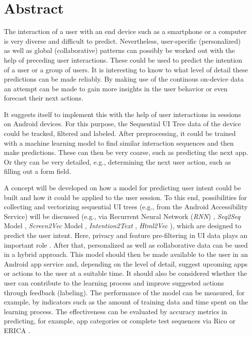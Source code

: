 \section*{Abstract}
\label{sec:abstract}


The interaction of a user with an end device such as a smartphone or a computer is very diverse and difficult to predict. Nevertheless, user-specific (personalized) as well as global (collaborative) patterns can possibly be worked out with the help of preceding user interactions. These could be used to predict the intention of a user or a group of users. It is interesting to know to what level of detail these predictions can be made reliably.
By making use of the continous on-device data an attempt can be made to gain more insights in the user behavior or even forecast their next actions.

It suggests itself to implement this with the help of user interactions in sessions on Android devices.
For this purpose, the Sequential UI Tree data of the device could be tracked, filtered and labeled.
After preprocessing, it could be trained with a machine learning model to find similar interaction sequences and then make predictions.
These can then be very coarse, such as predicting the next app.
Or they can be very detailed, e.g., determining the next user action, such as filling out a form field.

A concept will be developed on how a model for predicting user intent could be built and how it could be applied to the user session. To this end, possibilities for collecting and vectorizing sequential UI trees (e.g., from the Android Accessibility Service) will be discussed (e.g., via Recurrent Neural Network (\textit{RNN}) \cite{quadrana2017personalizing} \cite{bansal2022remembering} \cite{pietro2022recommendationSystems}, \textit{Seq2Seq} Model \cite{chollet2017seq2seq},
\textit{Screen2Vec} Model \cite{li2021screen2vec}, 
\textit{Intention2Text} \cite{yu2020understanding}, \textit{Html2Vec} \cite{wu2022distributed}), which are designed to predict the user intent. Here, privacy and feature pre-filtering in UI data plays an important role . After that, personalized as well as collaborative data can be used in a hybrid approach. This model should then be made available to the user in an Android app service and, depending on the level of detail, suggest upcoming apps or actions to the user at a suitable time. It should also be considered whether the user can contribute to the learning process and improve suggested actions through feedback (labeling).
The performance of the model can be measured, for example, by indicators such as the amount of training data and time spent on the learning process. The effectiveness can be evaluated by accuracy metrics in predicting, for example, app categories \cite{google2023appCategory} or complete test sequences via Rico \cite{deka2017rico} or ERICA \cite{deka2016erica}.

